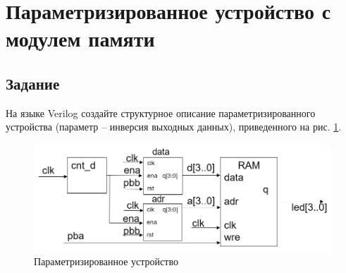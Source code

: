 \graphicspath{{../lab7/pics/}}

\section{Параметризированное устройство с модулем памяти}

\subsection{Задание}

На языке Verilog создайте структурное описание параметризированного устройства (параметр  -- инверсия выходных данных), приведенного на рис. \ref{fig:elab7_1_0}.

\begin{figure}[H]
\begin{center}
	\includegraphics[width=\textwidth]{elab7_1_0}
	\caption{Параметризированное устройство}
	\label{fig:elab7_1_0}
\end{center}
\end{figure}
\vspace{-0.5cm}

